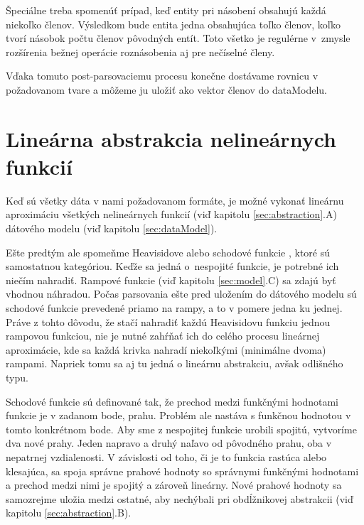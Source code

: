\documentclass[11pt,final,oneside]{fithesis}
\begin{document}
\v Speci\'alne treba spomen\'u\v t pr\'ipad, ke\v d entity pri n\'asoben\'i obsahuj\'u ka\v zd\'a nieko\v lko \v clenov. V\'ysledkom bude entita jedna 
obsahuj\'uca to\v lko \v clenov, ko\v lko tvor\'i n\'asobok po\v ctu \v clenov p\^ ovodn\'ych ent\'it. Toto v\v setko je regul\'erne v~zmys\-le roz\v s\'irenia be\v znej 
oper\'acie rozn\'asobenia aj pre ne\v c\'iseln\'e \v cleny.

V\v daka tomuto post-parsovaciemu procesu kone\v cne dost\'avame rovnicu v po\v zadovanom tvare a m\^ o\v zeme ju ulo\v zi\v t ako vektor \v clenov do 
dataModelu.

\section{Line\'arna abstrakcia neline\'arnych funkci\'i}
Ke\v d s\'u v\v setky d\'ata v nami po\v zadovanom form\'ate, je mo\v zn\'e vykona\v t line\'arnu aproxim\'aciu v\v setk\'ych neline\'arnych funkci\'i 
(vi\v d kapitolu \ref{sec:abstraction}.A) d\'atov\'eho modelu (vi\v d kapitolu \ref{sec:dataModel}).

E\v ste predt\'ym ale spome\v nme Heavisidove alebo schodov\'e funkcie \cite{step}, ktor\'e s\'u samostatnou kateg\'oriou. Ke\v d\v ze sa jedn\'a 
o~nespojit\'e funkcie, je potrebn\'e ich nie\v c\'im nahradi\v t. Rampov\'e funkcie (vi\v d kapitolu \ref{sec:model}.C) sa zdaj\'u by\v t vhodnou n\'ahradou. 
Po\v cas parsovania e\v ste pred ulo\v zen\'im do d\'atov\'eho modelu s\'u schodov\'e funkcie preveden\'e priamo na rampy, a to v pomere jedna ku jednej. 
Pr\'ave z tohto d\^ ovodu, \v ze sta\v c\'i nahradi\v t ka\v zd\'u Heavisidovu funkciu jednou rampovou funkciou, nie je nutn\'e zah\'r\v na\v t ich do 
cel\'eho procesu line\'arnej aproxim\'acie, kde sa ka\v zd\'a krivka nahrad\'i nieko\v lk\'ymi (minim\'alne dvoma) rampami. Napriek tomu sa aj tu jedn\'a 
o line\'arnu abstrakciu, av\v sak odli\v sn\'eho typu. 

Schodov\'e funkcie s\'u definovan\'e tak, \v ze prechod medzi funk\v cn\'ymi hodnotami funkcie je v zadanom bode, prahu. Probl\'em ale nast\'ava s funk\v cnou
hodnotou v tomto konkr\'etnom bode. Aby sme z nespojitej funkcie urobili spojit\'u, vytvor\'ime dva nov\'e prahy. Jeden napravo a druh\'y na\v lavo od 
p\^ ovodn\'eho prahu, oba v nepatrnej vzdialenosti. V z\'avislosti od toho, \v ci je to funkcia rast\'uca alebo klesaj\'uca, sa spoja spr\'avne prahov\'e hodnoty 
so spr\'avnymi funk\v cn\'ymi hodnotami a prechod medzi nimi je spojit\'y a z\'arove\v n line\'arny. Nov\'e prahov\'e hodnoty sa samozrejme ulo\v zia medzi
ostatn\'e, aby nech\'ybali pri obd\'l\v znikovej abstrakcii (vi\v d kapitolu \ref{sec:abstraction}.B).
\end{document}
